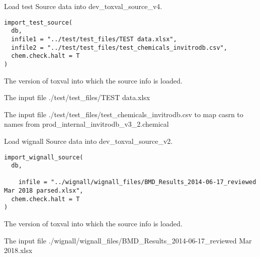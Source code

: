 \documentclass[letterpaper]{book}
\begin{document}
%
\begin{Description}\relax
Load test Source data into dev\_toxval\_source\_v4.
\end{Description}
%
\begin{Usage}
\begin{verbatim}
import_test_source(
  db,
  infile1 = "../test/test_files/TEST data.xlsx",
  infile2 = "../test/test_files/test_chemicals_invitrodb.csv",
  chem.check.halt = T
)
\end{verbatim}
\end{Usage}
%
\begin{Arguments}
\begin{ldescription}
\item[\code{db}] The version of toxval into which the source info is loaded.

\item[\code{infile1}] The input file ./test/test\_files/TEST data.xlsx

\item[\code{infile2}] The input file ./test/test\_files/test\_chemicals\_invitrodb.csv to map casrn to names from prod\_internal\_invitrodb\_v3\_2.chemical
\end{ldescription}
\end{Arguments}
%
\begin{Description}\relax
Load wignall Source data into dev\_toxval\_source\_v2.
\end{Description}
%
\begin{Usage}
\begin{verbatim}
import_wignall_source(
  db,
 
    infile = "../wignall/wignall_files/BMD_Results_2014-06-17_reviewed Mar 2018 parsed.xlsx",
  chem.check.halt = T
)
\end{verbatim}
\end{Usage}
%
\begin{Arguments}
\begin{ldescription}
\item[\code{db}] The version of toxval into which the source info is loaded.

\item[\code{infile}] The input file ./wignall/wignall\_files/BMD\_Results\_2014-06-17\_reviewed Mar 2018.xlsx
\end{ldescription}
\end{Arguments}
\end{document}
